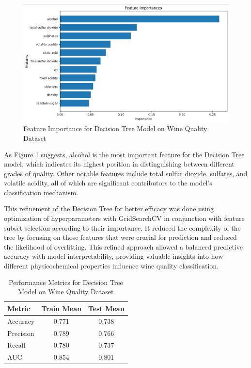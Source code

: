 \documentclass[conference]{IEEEtran}
\begin{document}
\begin{figure}[h]
    \includegraphics[width=\columnwidth]{plots/dt_wine_feature_importance.png}

  \caption{Feature Importance for Decision Tree Model on Wine Quality Dataset}

  \label{fig:dt_feature_importance_wine}

\end{figure}


As Figure \ref{fig:dt_feature_importance_wine} suggests, alcohol is the most important feature for the Decision Tree model, which indicates its highest position in distinguishing between different grades of quality. Other notable features include total sulfur dioxide, sulfates, and volatile acidity, all of which are significant contributors to the model's classification mechanism.

This refinement of the Decision Tree for better efficacy was done using optimization of hyperparameters with GridSearchCV in conjunction with feature subset selection according to their importance. It reduced the complexity of the tree by focusing on those features that were crucial for prediction and reduced the likelihood of overfitting. This refined approach allowed a balanced predictive accuracy with model interpretability, providing valuable insights into how different physicochemical properties influence wine quality classification.

\begin{table}[h]
  \centering
  \caption{Performance Metrics for Decision Tree Model on Wine Quality Dataset}
  \label{tab:dt_wine}
  \begin{tabular}{|l|c|c|}
  \hline
  \textbf{Metric}         & \textbf{Train Mean} & \textbf{Test Mean} \\ \hline
  Accuracy                & 0.771               & 0.738              \\ \hline
  Precision               & 0.789               & 0.766              \\ \hline
  Recall                  & 0.780               & 0.737              \\ \hline
  AUC                     & 0.854               & 0.801              \\ \hline
  \end{tabular}
  \end{table}
\end{document}
